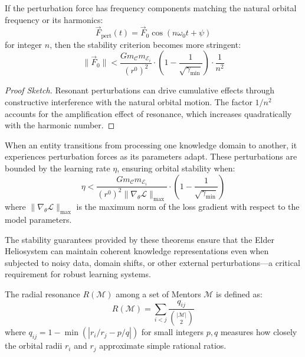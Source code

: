 \begin{corollary}
If the perturbation force has frequency components matching the natural orbital frequency or its harmonics:
\begin{equation}
\vec{F}_{\text{pert}}(t) = \vec{F}_0 \cos(n\omega_0 t + \psi)
\end{equation}
for integer $n$, then the stability criterion becomes more stringent:
\begin{equation}
\|\vec{F}_0\| < \frac{G m_{\mathcal{C}} m_{\mathcal{E}_i}}{(r^0)^2} \cdot \left(1 - \frac{1}{\sqrt{\gamma_{\text{min}}}}\right) \cdot \frac{1}{n^2}
\end{equation}
\end{corollary}

\begin{proof}[Proof Sketch]
Resonant perturbations can drive cumulative effects through constructive interference with the natural orbital motion. The factor $1/n^2$ accounts for the amplification effect of resonance, which increases quadratically with the harmonic number.
\end{proof}

\begin{example}
When an entity transitions from processing one knowledge domain to another, it experiences perturbation forces as its parameters adapt. These perturbations are bounded by the learning rate $\eta$, ensuring orbital stability when:
\begin{equation}
\eta < \frac{G m_{\mathcal{C}} m_{\mathcal{E}_i}}{(r^0)^2 \|\nabla_{\theta} \mathcal{L}\|_{\max}} \cdot \left(1 - \frac{1}{\sqrt{\gamma_{\text{min}}}}\right)
\end{equation}
where $\|\nabla_{\theta} \mathcal{L}\|_{\max}$ is the maximum norm of the loss gradient with respect to the model parameters.
\end{example}

The stability guarantees provided by these theorems ensure that the Elder Heliosystem can maintain coherent knowledge representations even when subjected to noisy data, domain shifts, or other external perturbations—a critical requirement for robust learning systems.

\begin{definition}
The radial resonance $R(\mathcal{M})$ among a set of Mentors $\mathcal{M}$ is defined as:
\begin{equation}
R(\mathcal{M}) = \sum_{i<j} \frac{q_{ij}}{\binom{|\mathcal{M}|}{2}}
\end{equation}
where $q_{ij} = 1 - \min(|r_i/r_j - p/q|)$ for small integers $p,q$ measures how closely the orbital radii $r_i$ and $r_j$ approximate simple rational ratios.
\end{definition}

